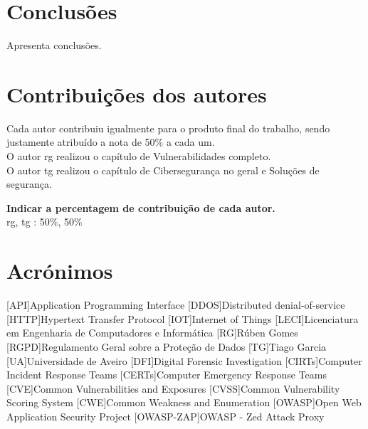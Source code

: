 \documentclass{report}
\begin{document}
\chapter{Conclusões}
\label{ch:conclusao}
Apresenta conclusões.

\chapter*{Contribuições dos autores}
Cada autor contribuiu igualmente para o produto final do trabalho, sendo justamente atribuído a nota de 50\% a cada um. \\
O autor \ac{rg} realizou o capítulo de Vulnerabilidades completo. \\
O autor \ac{tg} realizou o capítulo de Cibersegurança no geral e Soluções de segurança.

\vspace{10pt}
\textbf{Indicar a percentagem de contribuição de cada autor.}\\

\ac{rg}, \ac{tg} : 50\%, 50\%\\


\chapter*{Acrónimos}
\begin{acronym}
    [API]{Application Programming Interface}
    [DDOS]{Distributed denial-of-service}
    [HTTP]{Hypertext Transfer Protocol}
    [IOT]{Internet of Things}
    [LECI]{Licenciatura em Engenharia de Computadores e Informática}
    [RG]{Rúben Gomes}
    [RGPD]{Regulamento Geral sobre a Proteção de Dados}
    [TG]{Tiago Garcia}
    [UA]{Universidade de Aveiro}
    [DFI]{Digital Forensic Investigation}
    [CIRTs]{Computer Incident Response Teams}
    [CERTs]{Computer Emergency Response Teams}
    [CVE]{Common Vulnerabilities and Exposures}
    [CVSS]{Common Vulnerability Scoring System}
    [CWE]{Common Weakness and Enumeration}
    [OWASP]{Open Web Application Security Project}
    [OWASP-ZAP]{OWASP - Zed Attack Proxy}
\end{acronym}


\printbibliography
\end{document}
